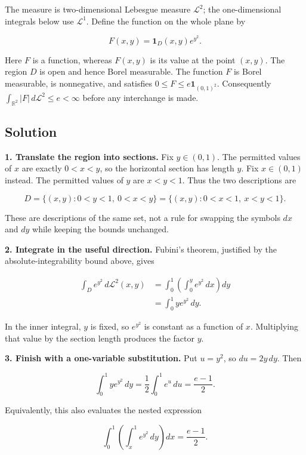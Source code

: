 \documentclass[
  11pt,
]{article}
\begin{document}
The measure is two-dimensional Lebesgue measure \(\mathcal L^2\); the
one-dimensional integrals below use \(\mathcal L^1\). Define the
function on the whole plane by

\[
F(x,y)=\mathbf 1_D(x,y)e^{y^2}.
\]

Here \(F\) is a function, whereas \(F(x,y)\) is its value at the point
\((x,y)\). The region \(D\) is open and hence Borel measurable. The
function \(F\) is Borel measurable, is nonnegative, and satisfies
\(0\leq F\leq e\mathbf 1_{(0,1)^2}\). Consequently
\(\int_{\mathbb R^2}|F|\,d\mathcal L^2\leq e<\infty\) before any
interchange is made.

\subsection{Solution}\label{solution}

\textbf{1. Translate the region into sections.} Fix \(y\in(0,1)\). The
permitted values of \(x\) are exactly \(0<x<y\), so the horizontal
section has length \(y\). Fix \(x\in(0,1)\) instead. The permitted
values of \(y\) are \(x<y<1\). Thus the two descriptions are

\[
D=\{(x,y):0<y<1,\ 0<x<y\}
 =\{(x,y):0<x<1,\ x<y<1\}.
\]

These are descriptions of the same set, not a rule for swapping the
symbols \(dx\) and \(dy\) while keeping the bounds unchanged.

\textbf{2. Integrate in the useful direction.} Fubini's theorem,
justified by the absolute-integrability bound above, gives

\[
\begin{aligned}
\int_D e^{y^2}\,d\mathcal L^2(x,y)
&=\int_0^1\left(\int_0^y e^{y^2}\,dx\right)dy\\
&=\int_0^1 y e^{y^2}\,dy.
\end{aligned}
\]

In the inner integral, \(y\) is fixed, so \(e^{y^2}\) is constant as a
function of \(x\). Multiplying that value by the section length produces
the factor \(y\).

\textbf{3. Finish with a one-variable substitution.} Put \(u=y^2\), so
\(du=2y\,dy\). Then

\[
\int_0^1 y e^{y^2}\,dy
=\frac12\int_0^1e^u\,du
=\boxed{\frac{e-1}{2}}.
\]

Equivalently, this also evaluates the nested expression

\[
\int_0^1\left(\int_x^1 e^{y^2}\,dy\right)dx
=\frac{e-1}{2}.
\]
\end{document}
